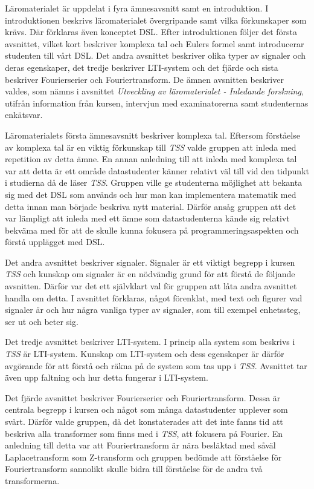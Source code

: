\documentclass[]{article}
\begin{document}
Läromaterialet är uppdelat i fyra ämnesavsnitt samt en introduktion. I
introduktionen beskrivs läromaterialet övergripande samt vilka
förkunskaper som krävs. Där förklaras även konceptet DSL. Efter
introduktionen följer det första avsnittet, vilket kort beskriver
komplexa tal och Eulers formel samt introducerar studenten till vårt
DSL. Det andra avsnittet beskriver olika typer av signaler och deras
egenskaper, det tredje beskriver LTI-system och det fjärde och sista
beskriver Fourierserier och Fouriertransform. De ämnen avsnitten
beskriver valdes, som nämns i avsnittet \textit{Utveckling av
 läromaterialet - Inledande forskning}, utifrån information från
kursen, intervjun med examinatorerna samt studenternas enkätsvar.

Läromaterialets första ämnesavsnitt beskriver komplexa tal. Eftersom
förståelse av komplexa tal är en viktig förkunskap till \textit{TSS}
valde gruppen att inleda med repetition av detta ämne. En annan
anledning till att inleda med komplexa tal var att detta är ett område
datastudenter känner relativt väl till vid den tidpunkt i studierna då
de läser \textit{TSS}. Gruppen ville ge studenterna möjlighet att
bekanta sig med det DSL som används och hur man kan implementera
matematik med detta innan man började beskriva nytt material. Därför
ansåg gruppen att det var lämpligt att inleda med ett ämne som
datastudenterna kände sig relativt bekväma med för att de skulle kunna
fokusera på programmeringsaspekten och förstå upplägget med DSL.

Det andra avsnittet beskriver signaler. Signaler är ett viktigt
begrepp i kursen \textit{TSS} och kunskap om signaler är en nödvändig
grund för att förstå de följande avsnitten. Därför var det ett
självklart val för gruppen att låta andra avsnittet handla om detta. I
avsnittet förklaras, något förenklat, med text och figurer vad
signaler är och hur några vanliga typer av signaler, som till exempel
enhetssteg, ser ut och beter sig.

Det tredje avsnittet beskriver LTI-system. I princip alla system som
beskrivs i \textit{TSS} är LTI-system. Kunskap om LTI-system och dess
egenskaper är därför avgörande för att förstå och räkna på de system
som tas upp i \textit{TSS}. Avsnittet tar även upp faltning och hur
detta fungerar i LTI-system.

Det fjärde avsnittet beskriver Fourierserier och
Fouriertransform. Dessa är centrala begrepp i kursen och något som
många datastudenter upplever som svårt. Därför valde gruppen, då det
konstaterades att det inte fanns tid att beskriva alla transformer som
finns med i \textit{TSS}, att fokusera på Fourier. En anledning till
detta var att Fouriertransform är nära besläktad med såväl
Laplacetransform som Z-transform och gruppen bedömde att
förståelse för Fouriertransform sannolikt skulle bidra till
förståelse för de andra två transformerna.
\end{document}
